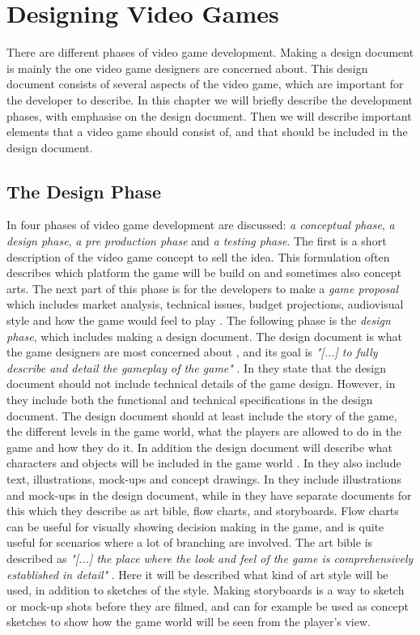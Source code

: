 \chapter{Designing Video Games} 
\label{chap:vg}
There are different phases of video game development. Making a design document is mainly the one video game designers are concerned about. This design document consists of several aspects of the video game, which are important for the developer to describe. In this chapter we will briefly describe the development phases, with emphasise on the design document. Then we will describe important elements that a video game should consist of, and that should be included in the design document.  

\section{The Design Phase}
\label{sec:designphase}
In \cite{understandingvg} four phases of video game development are discussed: \emph{a conceptual phase}, \emph{a design phase}, \emph{a pre production phase} and \emph{a testing phase}. The first is a short description of the video game concept to sell the idea. This formulation often describes which platform the game will be build on and sometimes also concept arts. The next part of this phase is for the developers to make a \emph{game proposal} which includes market analysis, technical issues, budget projections, audiovisual style and how the game would feel to play \cite{understandingvg}. The following phase is the \emph{design phase}, which includes making a design document. The design document is what the game designers are most concerned about \cite{gamedesign}, and its goal is \emph{"[...] to fully describe and detail the gameplay of the game"} \cite{gamedesign}.  In \cite{gamedesign} they state that the design document should not include  technical details of the game design. However, in \cite{understandingvg} they include both the functional and technical specifications in the design document. The design document should at least include the story of the game, the different levels in the game world, what the players are allowed to do in the game and how they do it. In addition the design document will describe what characters and objects will be included in the game world \cite{gamedesign}. In \cite{understandingvg} they also include text, illustrations, mock-ups and concept drawings. In \cite{understandingvg} they include illustrations and mock-ups in the design document, while in \cite{gamedesign} they have separate documents for this which they describe as art bible, flow charts, and storyboards. Flow charts can be useful for visually showing decision making in the game, and is quite useful for scenarios where a lot of branching are involved. The art bible is described as \emph{"[...] the place where the look and feel of the game is comprehensively established in detail"} \cite{gamedesign}. Here it will be described what kind of art style will be used, in addition to sketches of the style. Making storyboards is a way to sketch or mock-up shots before they are filmed, and can for example be used as concept sketches to show how the game world will be seen from the player's view. 

